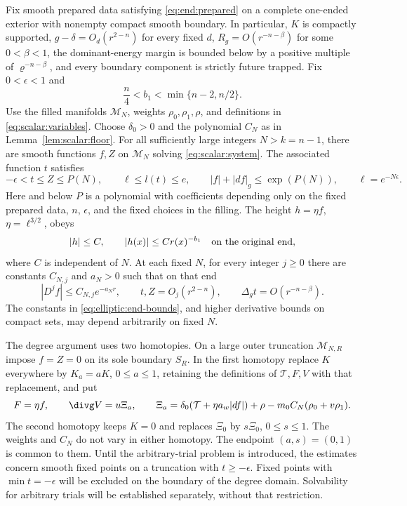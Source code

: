 \begin{theorem}\label{thm:elliptic:filled}
Fix smooth prepared data satisfying \eqref{eq:end:prepared}
on a complete one-ended exterior with nonempty compact smooth boundary.
In particular, $K$ is compactly supported,
$g-\delta=O_d(r^{2-n})$ for every fixed $d$,
$R_g=O(r^{-n-\beta})$ for some $0<\beta<1$,
the dominant-energy margin is bounded below by a positive multiple of
$\varrho^{-n-\beta}$, and every boundary component is strictly future
trapped.  Fix $0<\epsilon<1$ and
\[
 \frac n4<b_1<\min\{n-2,n/2\}.
\]
Use the filled manifolds $\mathcal M_N$, weights $\rho_0,\rho_1,\rho$,
and definitions in \eqref{eq:scalar:variables}.  Choose
$\delta_0>0$ and the polynomial $C_N$ as in
Lemma~\ref{lem:scalar:floor}.  For all sufficiently large integers
$N>k=n-1$, there are smooth functions $f,Z$ on $\mathcal M_N$
solving \eqref{eq:scalar:system}.  The associated function $t$
satisfies
\begin{equation}\label{eq:elliptic:polynomial-bounds}
 -\epsilon<t\le Z\le P(N),\qquad
 \ell\le l(t)\le e,\qquad
 |f|+|df|_g\le \exp(P(N)),\qquad \ell=e^{-N\epsilon}.
\end{equation}
Here and below $P$ is a polynomial with coefficients depending only on
the fixed prepared data, $n$, $\epsilon$, and the fixed choices in the
filling.  The height $h=\eta f$, $\eta=\ell^{3/2}$, obeys
\begin{equation}\label{eq:elliptic:height-bound}
 |h|\le C,\qquad |h(x)|\le C r(x)^{-b_1}
 \quad\hbox{on the original end},
\end{equation}
where $C$ is independent of $N$.  At each fixed $N$, for every integer
$j\ge0$ there are constants $C_{N,j}$ and $a_N>0$ such that on that end
\begin{equation}\label{eq:elliptic:end-bounds}
 |D^j f|\le C_{N,j}e^{-a_Nr},\qquad
 t,Z=O_j(r^{2-n}),\qquad
 \Delta_g t=O(r^{-n-\beta}).
\end{equation}
The constants in \eqref{eq:elliptic:end-bounds}, and higher
derivative bounds on compact sets, may depend arbitrarily on fixed $N$.
\end{theorem}

The degree argument uses two homotopies.  On a large
outer truncation $\mathcal M_{N,R}$ impose $f=Z=0$ on its sole boundary
$S_R$.  In the first homotopy replace $K$ everywhere by $K_a=aK$,
$0\le a\le1$, retaining the definitions of $\mathcal T,F,V$ with that
replacement, and put
\begin{equation}\label{eq:elliptic:homotopies}
 F=\eta f,\qquad
 \divg V=u\Xi_a,\qquad
 \Xi_a=\delta_0(\mathcal T+\eta a_w|df|)
       +\rho-m_0C_N(\rho_0+v\rho_1).
\end{equation}
The second homotopy keeps $K=0$ and replaces $\Xi_0$ by $s\Xi_0$,
$0\le s\le1$.  The weights and $C_N$ do not vary in either homotopy.
The endpoint $(a,s)=(0,1)$ is common to them.  Until the arbitrary-trial problem is introduced, the estimates concern
smooth fixed points on a truncation with $t\ge-\epsilon$.
Fixed points with $\min t=-\epsilon$ will be excluded on the boundary
of the degree domain.
Solvability for arbitrary trials will be established separately, without
that restriction.


